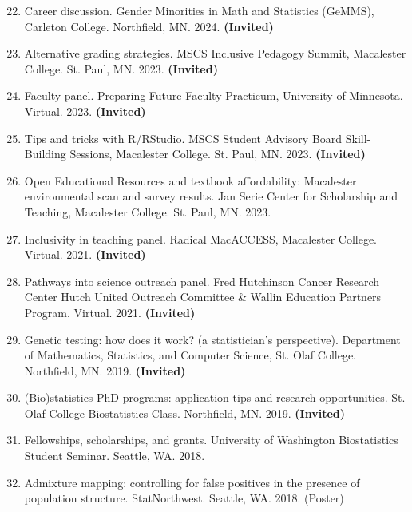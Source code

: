\documentclass[margin]{res}
\newenvironment{benumerate}[1]{
    \let\oldItem\item
    \def\item{\addtocounter{enumi}{-2}\oldItem}
    
    \begin{enumerate}
    \setcounter{enumi}{#1}
    \addtocounter{enumi}{1}
}{
    \end{enumerate}
}
\begin{document}
\begin{resume}
\begin{benumerate}{21}
\item Career discussion. Gender Minorities in Math and Statistics (GeMMS), Carleton College. Northfield, MN. 2024. \textbf{(Invited)}

\item Alternative grading strategies. MSCS Inclusive Pedagogy Summit, Macalester College. St. Paul, MN. 2023.  \textbf{(Invited)}

\item Faculty panel.  Preparing Future Faculty Practicum, University of Minnesota. Virtual. 2023. \textbf{(Invited)}

\item Tips and tricks with R/RStudio.  MSCS Student Advisory Board Skill-Building Sessions, Macalester College. St. Paul, MN. 2023. \textbf{(Invited)}

\item Open Educational Resources and textbook affordability: Macalester environmental scan and survey results.  Jan Serie Center for Scholarship and Teaching, Macalester College. St. Paul, MN. 2023.


\item Inclusivity in teaching panel. Radical MacACCESS, Macalester College. Virtual. 2021. \textbf{(Invited)}

\item Pathways into science outreach panel. Fred Hutchinson Cancer Research Center Hutch United Outreach Committee \& Wallin Education Partners Program. Virtual. 2021. \textbf{(Invited)}

\item Genetic testing: how does it work? (a statistician's perspective). Department of Mathematics, Statistics, and Computer Science, St. Olaf College. Northfield, MN. 2019. \textbf{(Invited)}

\item (Bio)statistics PhD programs: application tips and research opportunities. St. Olaf College Biostatistics Class. Northfield, MN. 2019. \textbf{(Invited)}

\item Fellowships, scholarships, and grants. University of Washington Biostatistics Student Seminar. Seattle, WA. 2018.

\item %
Admixture mapping: controlling for false positives in the presence of population structure. StatNorthwest. Seattle, WA. 2018. (Poster)


\end{benumerate}
\end{resume}
\end{document}
